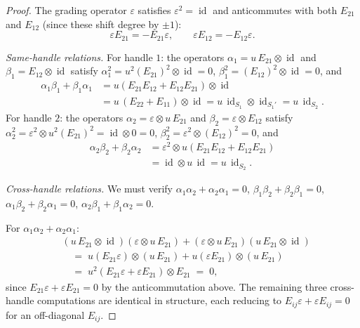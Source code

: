 \begin{proof}
The grading operator $\varepsilon$ satisfies
$\varepsilon^2 = \operatorname{id}$ and anticommutes with both
$E_{21}$ and $E_{12}$ (since these shift degree by $\pm 1$):
\[
\varepsilon E_{21} = -E_{21} \varepsilon,\qquad
\varepsilon E_{12} = -E_{12} \varepsilon.
\]

\emph{Same-handle relations.}
For handle $1$: the operators $\alpha_1 = u\,E_{21}\otimes\operatorname{id}$
and $\beta_1 = E_{12}\otimes\operatorname{id}$ satisfy
$\alpha_1^2 = u^2(E_{21})^2\otimes\operatorname{id} = 0$,
$\beta_1^2 = (E_{12})^2\otimes\operatorname{id} = 0$, and
\begin{align*}
\alpha_1\beta_1 + \beta_1\alpha_1
&= u(E_{21}E_{12} + E_{12}E_{21})\otimes\operatorname{id} \\
&= u\,(E_{22} + E_{11})\otimes\operatorname{id}
= u\,\operatorname{id}_{S_1}\otimes\operatorname{id}_{S_1'}
= u\,\operatorname{id}_{S_2}.
\end{align*}
For handle $2$: the operators
$\alpha_2 = \varepsilon \otimes u\,E_{21}$
and $\beta_2 = \varepsilon \otimes E_{12}$ satisfy
$\alpha_2^2 = \varepsilon^2 \otimes u^2(E_{21})^2 = \operatorname{id} \otimes 0 = 0$,
$\beta_2^2 = \varepsilon^2 \otimes (E_{12})^2 = 0$, and
\begin{align*}
\alpha_2\beta_2 + \beta_2\alpha_2
&= \varepsilon^2 \otimes u(E_{21}E_{12} + E_{12}E_{21}) \\
&= \operatorname{id} \otimes u\,\operatorname{id}
= u\,\operatorname{id}_{S_2}.
\end{align*}

\emph{Cross-handle relations.}
We must verify $\alpha_1\alpha_2 + \alpha_2\alpha_1 = 0$,
$\beta_1\beta_2 + \beta_2\beta_1 = 0$,
$\alpha_1\beta_2 + \beta_2\alpha_1 = 0$,
$\alpha_2\beta_1 + \beta_1\alpha_2 = 0$.

For $\alpha_1\alpha_2 + \alpha_2\alpha_1$:
\begin{align*}
&(u\,E_{21}\otimes\operatorname{id})
(\varepsilon\otimes u\,E_{21})
+
(\varepsilon\otimes u\,E_{21})
(u\,E_{21}\otimes\operatorname{id}) \\
&\quad=\;
u(E_{21}\varepsilon)\otimes(u\,E_{21})
+
u(\varepsilon E_{21})\otimes(u\,E_{21}) \\
&\quad=\;
u^2(E_{21}\varepsilon + \varepsilon E_{21})\otimes E_{21}
\;=\; 0,
\end{align*}
since $E_{21}\varepsilon + \varepsilon E_{21} = 0$
by the anticommutation above.
The remaining three cross-handle computations are identical
in structure, each reducing to
$E_{ij}\varepsilon + \varepsilon E_{ij} = 0$
for an off-diagonal $E_{ij}$.
\end{proof}


